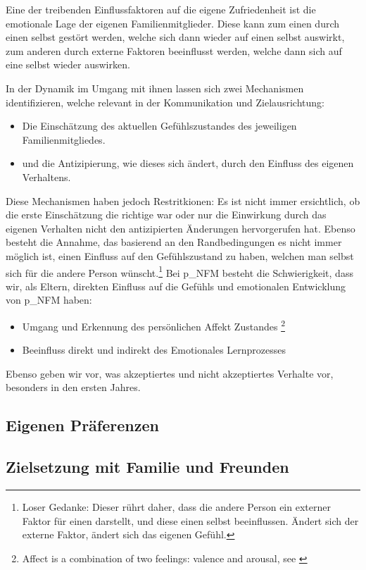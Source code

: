 Eine der treibenden Einflussfaktoren auf die eigene Zufriedenheit ist die emotionale Lage der eigenen Familienmitglieder. Diese kann zum einen durch einen selbst gestört werden, welche sich dann wieder auf einen selbst auswirkt, zum anderen durch externe Faktoren beeinflusst werden, welche dann sich auf eine selbst wieder auswirken.


In der Dynamik im Umgang mit ihnen lassen sich zwei Mechanismen identifizieren, welche relevant in der Kommunikation und Zielausrichtung:
\begin{itemize}
	\item Die Einschätzung des aktuellen Gefühlszustandes des jeweiligen Familienmitgliedes.
	\item und die Antizipierung, wie dieses sich ändert, durch den Einfluss des eigenen Verhaltens.
\end{itemize}
Diese Mechanismen haben jedoch Restritkionen: Es ist nicht immer ersichtlich, ob die erste Einschätzung die richtige war oder nur die Einwirkung durch das eigenen Verhalten nicht den antizipierten Änderungen hervorgerufen hat. Ebenso besteht die Annahme, das basierend an den Randbedingungen es nicht immer möglich ist, einen Einfluss auf den Gefühlszustand zu haben, welchen man selbst sich für die andere Person wünscht.\footnote{
	Loser Gedanke: Dieser rührt daher, dass die andere Person ein externer Faktor für einen darstellt, und diese einen selbst beeinflussen. Ändert sich der externe Faktor, ändert sich das eigenen Gefühl.
}
Bei \gls{p_NFM} besteht die Schwierigkeit, dass wir, als Eltern, direkten Einfluss auf die Gefühls und emotionalen Entwicklung von \gls{p_NFM} haben:
\begin{itemize}
 	\item Umgang und Erkennung des persönlichen Affekt Zustandes \footnote{
 		Affect is a combination of two feelings: valence and arousal, see \cite{Feldman-Barrett.Lisa}
 		}
 	\item Beeinfluss direkt und indirekt des Emotionales Lernprozesses
\end{itemize}
Ebenso geben wir vor, was akzeptiertes und nicht akzeptiertes Verhalte vor, besonders in den ersten Jahres.

\subsection{Eigenen Präferenzen}
\subsection{Zielsetzung mit Familie und Freunden}

